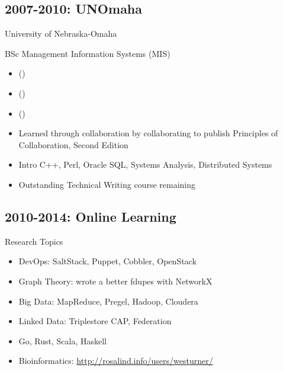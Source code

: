 \documentclass[letter,,openany,oneside]{sphinxhowto}
\begin{document}
\subsection{2007-2010: UNOmaha}
\label{resume:unomaha}
\begin{DUlineblock}{0em}
\item[] University of Nebraska-Omaha
\item[] BSc Management Information Systems (MIS)
\end{DUlineblock}
\begin{itemize}
\item {} 
{\hyperref[resume:uno\string-misso\string-president]{}} ()

\item {} 
{\hyperref[resume:ais\string-student\string-chapters\string-representative]{}} ()

\item {} 
{\hyperref[resume:id2]{}} ()

\item {} 
Learned through collaboration by collaborating to publish
Principles of Collaboration, Second Edition

\item {} 
Intro C++, Perl, Oracle SQL, Systems Analysis, Distributed Systems

\item {} 
Outstanding Technical Writing course remaining

\end{itemize}
\label{resume:uno-misso-president}\label{resume:misso-president}\label{resume:ais-student-chapters-representative}\label{resume:aissc-student-representative}

\subsection{2010-2014: Online Learning}
\label{resume:nebraska-humane-society-nonprofit-consulting}\label{resume:online-learning}\label{resume:id2}
Research Topics
\begin{itemize}
\item {} 
DevOps: SaltStack, Puppet, Cobbler, OpenStack

\item {} 
Graph Theory: wrote a better fdupes with NetworkX

\item {} 
Big Data: MapReduce, Pregel, Hadoop, Cloudera

\item {} 
Linked Data: Triplestore CAP, Federation

\item {} 
Go, Rust, Scala, Haskell

\item {} 
Bioinformatics: \url{http://rosalind.info/users/westurner/}

\end{itemize}
\end{document}
